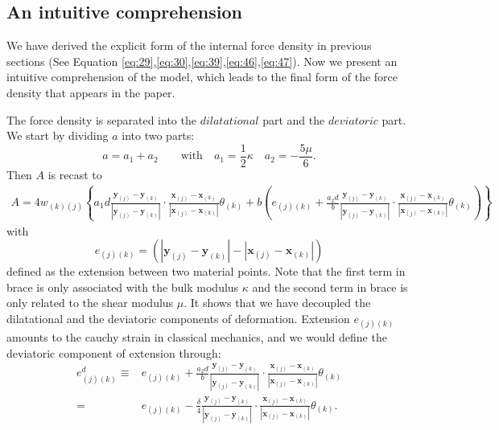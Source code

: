 \documentclass[11pt,fullpage]{article}
\newcommand{\mb}[1]{\mathbf{#1}}
\newcommand{\blue}[1]{#1}
\begin{document}
\subsection{An intuitive comprehension}

We have derived the explicit form of the internal force density in previous sections (See Equation \blue{\ref{eq:29}},\blue{\ref{eq:30},\blue{\ref{eq:39}},\blue{\ref{eq:46}},\blue{\ref{eq:47}}}). Now we present an intuitive comprehension of the model, which leads to the final form of the force density that appears in the paper.

The force density is separated into the $dilatational$ part and the $deviatoric$ part. We start by dividing $a$ into two parts:
\begin{equation}
a = a_1 + a_2 \qquad \mathrm{with}\quad a_1 = \frac{1}{2}\kappa \quad a_2 = -\frac{5\mu}{6}.
\label{eq:48}
\end{equation}
Then $A$ is recast to
\begin{equation}
\begin{aligned}
A =4w_{(k)(j)}\left\{a_1d\frac{\mb{y}_{(j)}-\mb{y}_{(k)}}{|\mb{y}_{(j)}-\mb{y}_{(k)}|}\cdot\frac{\mb{x}_{(j)}-\mb{x}_{(k)}}{|\mb{x}_{(j)}-\mb{x}_{(k)}|}\theta_{(k)}
   +b\left(e_{(j)(k)} + \frac{a_2d}{b}\frac{\mb{y}_{(j)}-\mb{y}_{(k)}}{|\mb{y}_{(j)}-\mb{y}_{(k)}|}\cdot\frac{\mb{x}_{(j)}-\mb{x}_{(k)}}{|\mb{x}_{(j)}-\mb{x}_{(k)}|}\theta_{(k)}\right) \right\}
\end{aligned}
\label{eq:49}
\end{equation}
with
\begin{equation}
e_{(j)(k)} = (|\mb{y}_{(j)} - \mb{y}_{(k)}| - |\mb{x}_{(j)} - \mb{x}_{(k)}|)
\label{eq:50}
\end{equation}
defined as the extension between two material points. Note that the first term in brace is only associated with the bulk modulus $\kappa$ and the second term in brace is only related to the shear modulus $\mu$.
It shows that we have decoupled the dilatational and the deviatoric components of deformation.
Extension $e_{(j)(k)}$ amounts to the cauchy strain in classical mechanics, and we would define the deviatoric component of extension through:
\begin{equation}
\begin{aligned}
e^d_{(j)(k)} \equiv& e_{(j)(k)} + \frac{a_2d}{b}\frac{\mb{y}_{(j)}-\mb{y}_{(k)}}{|\mb{y}_{(j)}-\mb{y}_{(k)}|}\cdot\frac{\mb{x}_{(j)}-\mb{x}_{(k)}}{|\mb{x}_{(j)}-\mb{x}_{(k)}|}\theta_{(k)}\\
                  =& e_{(j)(k)} - \frac{\delta}{4}\frac{\mb{y}_{(j)}-\mb{y}_{(k)}}{|\mb{y}_{(j)}-\mb{y}_{(k)}|}\cdot\frac{\mb{x}_{(j)}-\mb{x}_{(k)}}{|\mb{x}_{(j)}-\mb{x}_{(k)}|}\theta_{(k)}.
\end{aligned}
\label{eq:51}
\end{equation}
\end{document}
